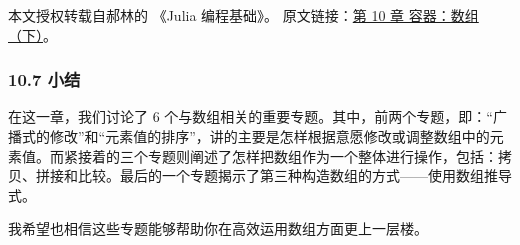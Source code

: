
本文授权转载自郝林的 《Julia 编程基础》。 原文链接：\href{https://github.com/hyper0x/JuliaBasics/blob/master/book/ch10.md}{第 10 章 容器：数组（下）}。


\subsubsection{10.7 小结}

在这一章，我们讨论了 6 个与数组相关的重要专题。其中，前两个专题，即：“广播式的修改”和“元素值的排序”，讲的主要是怎样根据意愿修改或调整数组中的元素值。而紧接着的三个专题则阐述了怎样把数组作为一个整体进行操作，包括：拷贝、拼接和比较。最后的一个专题揭示了第三种构造数组的方式——使用数组推导式。

我希望也相信这些专题能够帮助你在高效运用数组方面更上一层楼。
